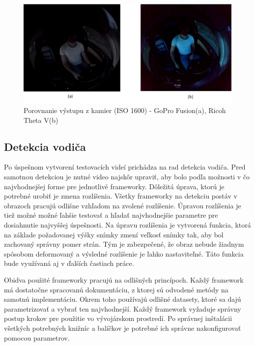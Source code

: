 \documentclass[slovak,master,dept460,male,cpp,cpdeclaration]{diploma}
\begin{document}
\begin{figure}[H]
	\centering
	\includegraphics[width=1\textwidth]{Figures/camCompare.png}
	\caption{Porovnanie výstupu z kamier (ISO 1600) - GoPro Fusion(a), Ricoh Theta V(b)}
	\label{fig:cameraCompare}
\end{figure}



\newpage
\subsection{Detekcia vodiča}
\label{sec:driverDetection}
Po úspešnom vytvorení testovacích videí prichádza na rad detekcia vodiča. Pred samotnou detekciou je nutné video najskôr upraviť, aby bolo podľa možnosti v čo najvhodnejšej forme pre jednotlivé frameworky. Dôležitá úprava, ktorú je potrebné urobiť je zmena rozlíšenia. Všetky frameworky na detekciu postáv v obrazoch pracujú odlišne vzhľadom na zvolené rozlíšenie. Úpravou rozlíšenia je tiež možné možné ľahšie testovať a hľadať najvhodnejšie parametre pre dosiahnutie  najvyššej úspešnosti. Na úpravu rozlíšenia je vytvorená funkcia, ktorá na základe požadovanej výšky  snímky  zmení veľkosť  snímky tak, aby bol zachovaný správny pomer strán. Tým je zabezpečené, že obraz nebude žiadnym spôsobom deformovaný a výsledné rozlíšenie je ľahko nastaviteľné. Táto funkcia bude využívaná aj v ďalších častiach práce.\par
Obidva použité frameworky pracujú na odlišných princípoch.  Každý framework má  dostatočne spracovanú dokumentáciu, z ktorej sú odvodené metódy na samotnú implementáciu. Okrem toho používajú odlišné datasety, ktoré sa dajú parametrizovať a vybrať ten najvhodnejší. Každý framework  vyžaduje správny postup krokov pre použitie vo vývojárskom prostredí. Po správnej inštalácii všetkých potrebných knižníc a balíčkov  je potrebné ich správne nakonfigurovať pomocou parametrov.
\end{document}
